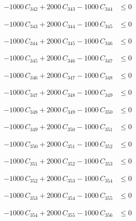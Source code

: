 \documentclass[a4paper,11pt]{article}
\begin{document}
\begin{align}
-1000\,C_{342} + 2000\,C_{343} - 1000\,C_{344} &\leq 0 \nonumber
\end{align}

\begin{align}
-1000\,C_{343} + 2000\,C_{344} - 1000\,C_{345} &\leq 0 \nonumber
\end{align}

\begin{align}
-1000\,C_{344} + 2000\,C_{345} - 1000\,C_{346} &\leq 0 \nonumber
\end{align}

\begin{align}
-1000\,C_{345} + 2000\,C_{346} - 1000\,C_{347} &\leq 0 \nonumber
\end{align}

\begin{align}
-1000\,C_{346} + 2000\,C_{347} - 1000\,C_{348} &\leq 0 \nonumber
\end{align}

\begin{align}
-1000\,C_{347} + 2000\,C_{348} - 1000\,C_{349} &\leq 0 \nonumber
\end{align}

\begin{align}
-1000\,C_{348} + 2000\,C_{349} - 1000\,C_{350} &\leq 0 \nonumber
\end{align}

\begin{align}
-1000\,C_{349} + 2000\,C_{350} - 1000\,C_{351} &\leq 0 \nonumber
\end{align}

\begin{align}
-1000\,C_{350} + 2000\,C_{351} - 1000\,C_{352} &\leq 0 \nonumber
\end{align}

\begin{align}
-1000\,C_{351} + 2000\,C_{352} - 1000\,C_{353} &\leq 0 \nonumber
\end{align}

\begin{align}
-1000\,C_{352} + 2000\,C_{353} - 1000\,C_{354} &\leq 0 \nonumber
\end{align}

\begin{align}
-1000\,C_{353} + 2000\,C_{354} - 1000\,C_{355} &\leq 0 \nonumber
\end{align}

\begin{align}
-1000\,C_{354} + 2000\,C_{355} - 1000\,C_{356} &\leq 0 \nonumber
\end{align}
\end{document}
